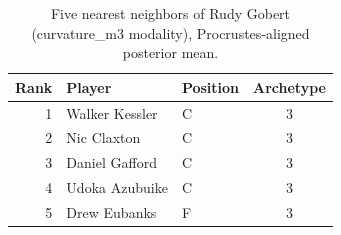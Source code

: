 \begin{table}[htbp]
  \centering\small
  \begin{tabular}{rllc}
    \toprule
    Rank & Player & Position & Archetype \\
    \midrule
    1 & Walker Kessler & C & 3 \\
    2 & Nic Claxton & C & 3 \\
    3 & Daniel Gafford & C & 3 \\
    4 & Udoka Azubuike & C & 3 \\
    5 & Drew Eubanks & F & 3 \\
    \bottomrule
  \end{tabular}
  \caption{Five nearest neighbors of Rudy Gobert (curvature_m3 modality), Procrustes-aligned posterior mean.}
  \label{tab:Rudy_Gobert_neighbors_curvature_m3}
\end{table}

